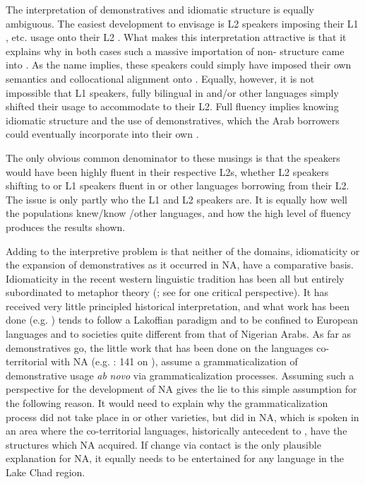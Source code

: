 \documentclass[output=paper]{langsci/langscibook}
\begin{document}
The interpretation of {demonstratives} and {idiomatic} structure is equally ambiguous. The easiest development to envisage is L2  speakers imposing their L1 ,  etc. usage onto their L2 . What makes this interpretation attractive is that it explains why in both cases such a massive importation of non- structure came into . As the name implies, these speakers could simply have imposed their own semantics and collocational alignment onto . Equally, however, it is not impossible that L1  speakers, fully bilingual in  and/or other languages simply shifted their  usage to accommodate to their L2. Full fluency implies knowing {idiomatic} structure and the use of {demonstratives}, which the Arab borrowers could eventually incorporate into their own .

The only obvious common denominator to these musings is that the speakers would have been highly fluent in their respective L2s, whether L2  speakers shifting to  or L1  speakers fluent in  or other languages borrowing from their L2. The issue is only partly who the L1 and L2 speakers are. It is equally how well the populations knew/know /other languages, and how the high level of fluency produces the results shown.\pagebreak

Adding to the interpretive problem is that neither of the domains, {idiomaticity} or the expansion of {demonstratives} as it occurred in NA, have a {comparative} basis. Idiomaticity in the recent western linguistic tradition has been all but entirely subordinated to metaphor theory (\citealt{LakoffJohnson1999}; see \citealt{Haser2005} for one critical perspective). It has received very little principled historical interpretation, and what work has been done (e.g. \citealt{Sweetser1990}) tends to follow a Lakoffian paradigm and to be confined to European languages and to societies quite different from that of Nigerian Arabs. As far as {demonstratives} go, the little work that has been done on the languages co-territorial with NA (e.g. \citealt{Kramer2014}: 141 on ), assume a {grammaticalization} of demonstrative usage \textit{ab} \textit{novo} via {grammaticalization} processes. Assuming such a perspective for the development of NA gives the lie to this simple assumption for the following reason. It would need to explain why the {grammaticalization} process did not take place in  or other  varieties, but did in NA, which is spoken in an area where the co-territorial languages, historically antecedent to , have the structures which NA acquired. If change via contact is the only plausible explanation for NA, it equally needs to be entertained for any language in the {Lake Chad} region.
\end{document}
